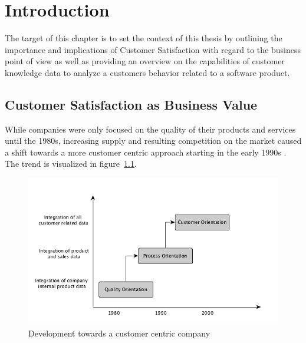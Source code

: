 \chapter{Introduction}
\label{ch:intro}
The target of this chapter is to set the context of this thesis by outlining the importance and implications of Customer Satisfaction with regard to the business point of view as well as providing an overview on the capabilities of customer knowledge data to analyze a customers behavior related to a software product. 

\section{Customer Satisfaction as Business Value}
While companies were only focused on the quality of their products and services until the 1980s, increasing supply and resulting competition on the market caused a shift towards a more customer centric approach starting in the early 1990s \cite{neckel2015}. The trend is visualized in figure~\ref{fig:introDevelopment}. 

\begin{figure}
	\centering
		\includegraphics[width=1.0\textwidth]{img/introDevelopment.png}
	\caption{Development towards a customer centric company \cite{neckel2015}}
	\label{fig:introDevelopment}
\end{figure} 

